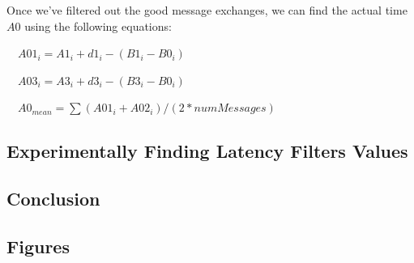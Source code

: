 

Once we've filtered out the good message exchanges, we can find the actual time $ A0$ using the following equations:

\ \ $ A01_i = A1_i + d1_i - (B1_i-B0_i)$\ \ 

\ \ $ A03_i = A3_i + d3_i - (B3_i - B0_i)$\ \ 

\ \ $ A0_{mean} = \sum (A01_i + A02_i) / (2 * numMessages)$\ \


\subsection[Experimentally Finding Latency Filters Values ]{Experimentally Finding Latency Filters Values }

\subsection{Conclusion}

\subsection{Figures}

